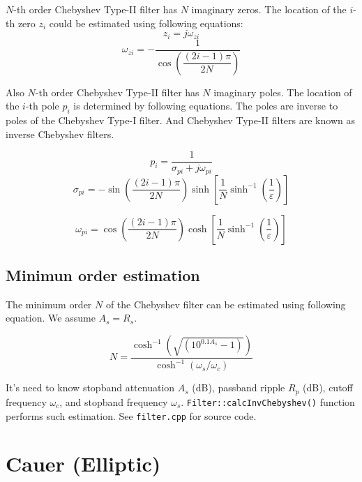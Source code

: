 $N$-th order Chebyshev Type-II filter has $N$ imaginary zeros. The location of
the $i$-th zero $z_i$ could be estimated using following equations:
\begin{equation}
 z_i = j\omega_{zi}
\end{equation}
\begin{equation}
 \omega_{zi} = -\frac{1}{\cos\left(\dfrac{(2i-1)\pi}{2N}\right)}
\end{equation}

Also $N$-th order Chebyshev Type-II filter has $N$ imaginary poles. The
location of the $i$-th pole $p_i$ is determined by following equations. The
poles are inverse to poles of the Chebyshev Type-I filter. And Chebyshev
Type-II filters are known as inverse Chebyshev filters.

\begin{equation}
 p_{i} = \frac{1}{\sigma_{pi}+j\omega_{pi}}
\end{equation}
\begin{equation}
 \sigma_{pi} = -\sin\left(\frac{(2i-1)\pi}{2N}\right)           
\sinh\left[\frac{1}{N}\sinh^{-1}\left(\frac{1}{\varepsilon}\right)\right]
\end{equation}

\begin{equation}
 \omega_{pi} = \cos\left(\frac{(2i-1)\pi}{2N}\right)           
\cosh\left[\frac{1}{N}\sinh^{-1}\left(\frac{1}{\varepsilon}\right)\right]
\end{equation}

\subsection{Minimun order estimation}

The minimum order $N$ of the Chebyshev filter can be estimated using following
equation. We assume $A_s=R_s$.

\begin{equation}
 N = \frac{\cosh^{-1}(\sqrt{(10^{0.1A_s}-1)})}{\cosh^{-1}(\omega_s/\omega_c)}
\label{cheby2-order}
\end{equation}

It's need to
know stopband attenuation $A_s$ (dB), passband ripple $R_p$ (dB), cutoff
frequency $\omega_c$, and stopband frequency $\omega_s$.
\verb|Filter::calcInvChebyshev()| function performs such estimation. See
\verb|filter.cpp| for source code.

\section{Cauer (Elliptic)}

